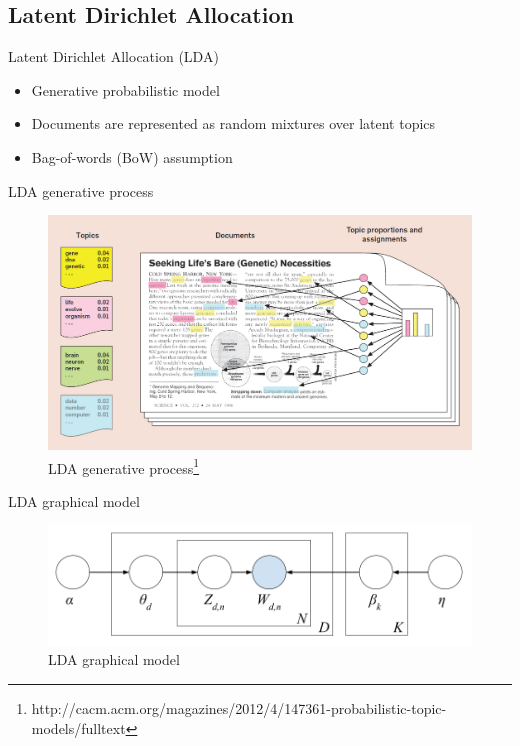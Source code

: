 \documentclass{beamer}
\begin{document}
\subsection{Latent Dirichlet Allocation}
\begin{frame}{Latent Dirichlet Allocation (LDA)}
	\begin{itemize}
		\item Generative probabilistic model
		\item Documents are represented as random mixtures over latent topics
		\item Bag-of-words (BoW) assumption
	\end{itemize}
\end{frame}
\begin{frame}{LDA generative process}
	\begin{figure}[h]
		\centering
		\includegraphics[scale=0.2]{lda_famous}
		\caption{LDA generative process\footnote[frame]{http://cacm.acm.org/magazines/2012/4/147361-probabilistic-topic-models/fulltext}}
	\end{figure}
\end{frame}
\begin{frame}{LDA graphical model}
	\begin{figure}[h]
		\centering
		\includegraphics[scale=0.3]{lda_model}
		\caption{LDA graphical model}
		\label{fig:lda_model}
	\end{figure}
\end{frame}
\end{document}
